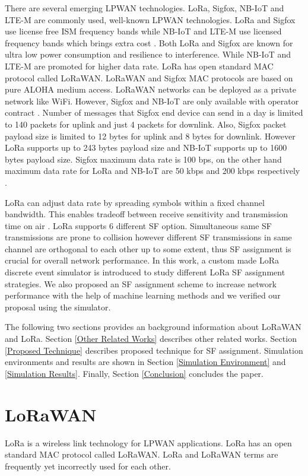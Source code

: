 \documentclass[conference]{IEEEtran}
\begin{document}
\par There are several emerging LPWAN technologies. LoRa, Sigfox, NB-IoT and LTE-M are commonly used, well-known LPWAN technologies. LoRa and Sigfox use license free ISM frequency bands while NB-IoT and LTE-M use licensed frequency bands which brings extra cost \cite{7815384}. Both LoRa and Sigfox are known for ultra low power consumption and resilience to interference.  While NB-IoT and LTE-M are promoted for higher data rate. LoRa has open standard MAC protocol called LoRaWAN. LoRaWAN and Sigfox MAC protocols are based on pure ALOHA medium access. LoRaWAN networks can be deployed as a private network like WiFi. However, Sigfox and NB-IoT are only available with operator contract \cite{7815384}. Number of messages that Sigfox end device can send in a day is limited to 140 packets for uplink and just 4 packets for downlink. Also, Sigfox packet payload size is limited to 12 bytes for uplink and 8 bytes for downlink. However LoRa supports up to 243 bytes payload size and NB-IoT supports up to 1600 bytes payload size. Sigfox maximum data rate is 100 bps, on the other hand maximum data rate for LoRa and NB-IoT are 50 kbps and 200 kbps respectively \cite{7815384}.

\par LoRa can adjust data rate by spreading symbols within a fixed channel bandwidth. This enables tradeoff between receive sensitivity and transmission time on air \cite{7803607}. LoRa supports 6 different SF option. Simultaneous same SF transmissions are prone to collision however different SF transmissions in same channel are orthogonal to each other up to some extent, thus SF assignment is crucial for overall network performance. In this work, a custom made LoRa discrete event simulator is introduced to study different LoRa SF assignment strategies. We also proposed an SF assignment scheme to increase network performance with the help of machine learning methods and we verified our proposal using the simulator.

\par The following two sections provides an background information about LoRaWAN and LoRa. Section \ref{Other Related Works} describes other related works. Section \ref{Proposed Technique} describes proposed technique for SF assignment. Simulation environments and results are shown in Section \ref{Simulation Environment} and \ref{Simulation Results}. Finally, Section \ref{Conclusion} concludes the paper.


\section{LoRaWAN} \label{LoRaWAN}
\par LoRa is a wireless link technology for LPWAN applications. LoRa has an open standard MAC protocol called LoRaWAN. LoRa and LoRaWAN terms are frequently yet incorrectly used for each other.
\end{document}
